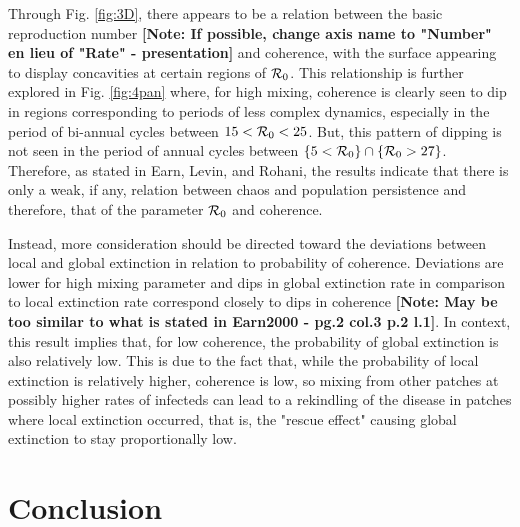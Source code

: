 \documentclass[twocolumn,nofootinbib,showkeys,twoside,floatfix,unsortedaddress,flushbottom,10pt,aps,pra]{report}
\begin{document}
Through Fig. \ref{fig:3D}, there appears to be a relation between the basic reproduction number \textbf{[Note: If possible, change axis name to "Number" en lieu of "Rate" - presentation]} and coherence, with the surface appearing to display concavities at certain regions of ${\cal R}_0$. This relationship is further explored in Fig. \ref{fig:4pan} where, for high mixing, coherence is clearly seen to dip in regions corresponding to periods of less complex dynamics, especially in the period of bi-annual cycles between $15<{\cal R}_0<25$. But, this pattern of dipping is not seen in the period of annual cycles between $\{5<{\cal R}_0\}\cap\{{\cal R}_0>27\}$. Therefore, as stated in Earn, Levin, and Rohani, the results indicate that there is only a weak, if any, relation between chaos and population persistence\cite{Earn2000} and therefore, that of the parameter ${\cal R}_0$ and coherence. \par \smallskip \qquad
Instead, more consideration should be directed toward the deviations between local and global extinction in relation to probability of coherence. Deviations are lower for high mixing parameter and dips in global extinction rate in comparison to local extinction rate correspond closely to dips in coherence \textbf{[Note: May be too similar to what is stated in Earn2000 - pg.2 col.3 p.2 l.1]}. In context, this result implies that, for low coherence, the probability of global extinction is also relatively low. This is due to the fact that, while the probability of local extinction is relatively higher, coherence is low, so mixing from other patches at possibly higher rates of infecteds can lead to a rekindling of the disease in patches where local extinction occurred, that is, the "rescue effect" causing global extinction to stay proportionally low.
\section{Conclusion} 


\onecolumn
{}%

 
\end{document}
